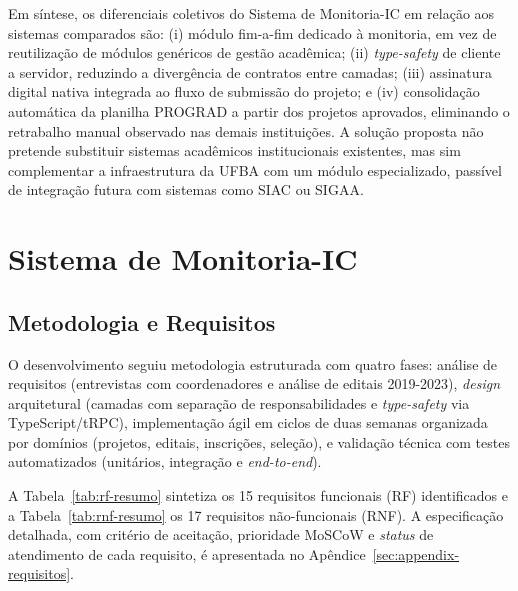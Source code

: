 \documentclass[portuguese]{sbc2025}%
\begin{document}
Em síntese, os diferenciais coletivos do Sistema de Monitoria-IC em relação aos sistemas comparados são: (i) módulo fim-a-fim dedicado à monitoria, em vez de reutilização de módulos genéricos de gestão acadêmica; (ii) \textit{type-safety} de cliente a servidor, reduzindo a divergência de contratos entre camadas; (iii) assinatura digital nativa integrada ao fluxo de submissão do projeto; e (iv) consolidação automática da planilha PROGRAD a partir dos projetos aprovados, eliminando o retrabalho manual observado nas demais instituições. A solução proposta não pretende substituir sistemas acadêmicos institucionais existentes, mas sim complementar a infraestrutura da UFBA com um módulo especializado, passível de integração futura com sistemas como SIAC ou SIGAA.

\section{Sistema de Monitoria-IC}
\label{sec:system}

\subsection{Metodologia e Requisitos}
\label{sec:methodology}
\label{sec:requisitos}

O desenvolvimento seguiu metodologia estruturada com quatro fases: análise de requisitos (entrevistas com coordenadores e análise de editais 2019-2023), \textit{design} arquitetural (camadas com separação de responsabilidades e \textit{type-safety} via TypeScript/tRPC), implementação ágil em ciclos de duas semanas organizada por domínios (projetos, editais, inscrições, seleção), e validação técnica com testes automatizados (unitários, integração e \textit{end-to-end}).

A Tabela~\ref{tab:rf-resumo} sintetiza os 15 requisitos funcionais (RF) identificados e a Tabela~\ref{tab:rnf-resumo} os 17 requisitos não-funcionais (RNF). A especificação detalhada, com critério de aceitação, prioridade MoSCoW e \textit{status} de atendimento de cada requisito, é apresentada no Apêndice~\ref{sec:appendix-requisitos}.
\end{document}
